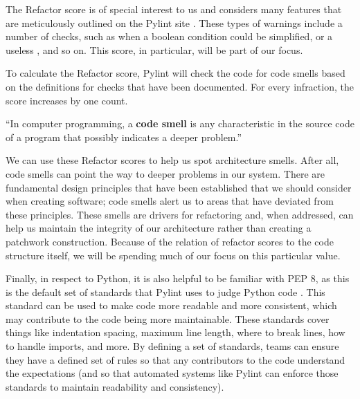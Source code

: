 The Refactor score is of special interest to us and considers many features that are meticulously outlined on the Pylint site \cite{pylint:refactor}. These types of warnings include a number of checks, such as when a boolean condition could be simplified, or a useless , and so on. This score, in particular, will be part of our focus.

To calculate the Refactor score, Pylint will check the code for code smells based on the definitions for checks that have been documented. For every infraction, the score increases by one count. 


\vspace{0.25cm}
\begin{displayquote}
  ``In computer programming, a \textbf{code smell} is any characteristic in the source code of a program that possibly indicates a deeper problem.'' \cite{wiki:code-smells}
\end{displayquote}
\vspace{0.25cm}

We can use these Refactor scores to help us spot architecture smells. After all, code smells can point the way to deeper problems in our system. There are fundamental design principles that have been established that we should consider when creating software; code smells alert us to areas that have deviated from these principles. These smells are drivers for refactoring and, when addressed, can help us maintain the integrity of our architecture rather than creating a patchwork construction. Because of the relation of refactor scores to the code structure itself, we will be spending much of our focus on this particular value.

Finally, in respect to Python, it is also helpful to be familiar with PEP 8, as this is the default set of standards that Pylint uses to judge Python code \cite{pylint:pep8}. This standard can be used to make code more readable and more consistent, which may contribute to the code being more maintainable. These standards cover things like indentation spacing, maximum line length, where to break lines, how to handle imports, and more. By defining a set of standards, teams can ensure they have a defined set of rules so that any contributors to the code understand the expectations (and so that automated systems like Pylint can enforce those standards to maintain readability and consistency).

